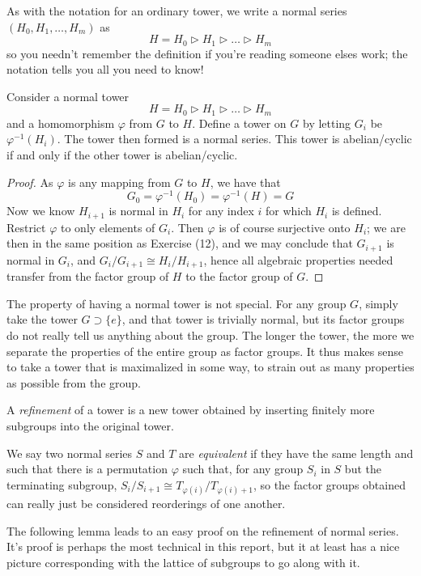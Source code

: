 As with the notation for an ordinary tower, we write a normal series $(H_0, H_1, \dots, H_m)$ as
%
\[ H = H_0 \rhd H_1 \rhd \dots \rhd H_m \]
%
so you needn't remember the definition if you're reading someone elses work; the notation tells you all you need to know!

\begin{theorem}
    Consider a normal tower
    \[ H = H_0 \rhd H_1 \rhd \dots \rhd H_m \]
    and a homomorphism $\varphi$ from $G$ to $H$. Define a tower on $G$ by letting $G_i$ be $\varphi^{-1}(H_i)$. The tower then formed is a normal series. This tower is abelian/cyclic if and only if the other tower is abelian/cyclic.
\end{theorem}
\begin{proof}
    As $\varphi$ is any mapping from $G$ to $H$, we have that
    \[ G_0 = \varphi^{-1}(H_0) = \varphi^{-1}(H) = G \]
    Now we know $H_{i+1}$ is normal in $H_i$ for any index $i$ for which $H_i$ is defined. Restrict $\varphi$ to only elements of $G_i$. Then $\varphi$ is of course surjective onto $H_i$; we are then in the same position as Exercise (12), and we may conclude that $G_{i+1}$ is normal in $G_i$, and $G_i/G_{i+1} \cong H_i/H_{i+1}$, hence all algebraic properties needed transfer from the factor group of $H$ to the factor group of $G$.
\end{proof}

The property of having a normal tower is not special. For any group $G$, simply take the tower $G \supset \{e\}$, and that tower is trivially normal, but its factor groups do not really tell us anything about the group. The longer the tower, the more we separate the properties of the entire group as factor groups. It thus makes sense to take a tower that is maximalized in some way, to strain out as many properties as possible from the group.

A \emph{refinement} of a tower is a new tower obtained by inserting finitely more subgroups into the original tower.

We say two normal series $S$ and $T$ are \emph{equivalent}  if they have the same length and such that there is a permutation $\varphi$ such that, for any group $S_i$ in $S$ but the terminating subgroup, $S_i/S_{i+1} \cong T_{\varphi(i)}/T_{\varphi(i) + 1}$, so the factor groups obtained can really just be considered reorderings of one another.

The following lemma leads to an easy proof on the refinement of normal series. It's proof is perhaps the most technical in this report, but it at least has a nice picture corresponding with the lattice of subgroups to go along with it.%

